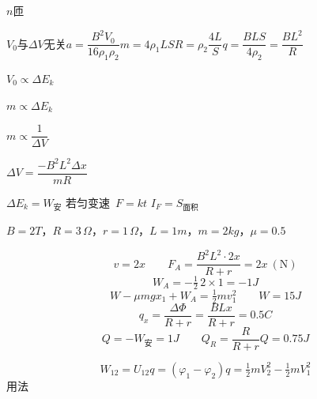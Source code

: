 \quad $n$匝\ 

$V_0$与$\Delta V$无关\qquad $a=\dfrac{B^2V_0}{16\rho_1\rho_2}$\quad $m=4\rho_1LS$\quad $R=\rho_2\dfrac{4L}{S}$\quad $q=\dfrac{BLS}{4\rho_2}=\dfrac{BL^2}{R}$

$V_0\propto\Delta E_k$\qquad {} %

$m\propto\Delta E_k$

$m\propto\dfrac{1}{\Delta V}$

$\Delta V=\dfrac{-B^2L^2\Delta x}{mR}$

$\Delta E_k=W_{\text{安}}$
若匀变速\ $F=kt$
$I_F=S_{\text{面积}}$
\begin{problem}
$B=2\unit{T}$，$R=3\,\Omega$，$r=1\,\Omega$，$L=1\unit{m}$，$m=2\unit{kg}$，$\mu=0.5$
\begin{solution}
\[ v=2x\qquad F_A=\frac{B^2L^2\cdot2x}{R+r}=2x\ (\mathrm{N}) \]
\[ W_A=-\tfrac12\,2\times1=-1\unit{J} \]
\[ W-\mu mgx_1+W_A=\tfrac12mv_1^2\qquad W=15\unit{J} \]
\[ q_x=\frac{\Delta\Phi}{R+r}=\frac{BLx}{R+r}=0.5\unit{C} \]
\[ Q=-W_{\text{安}}=1\unit{J}\qquad Q_R=\frac{R}{R+r}Q=0.75\unit{J} \]
\end{solution}
\end{problem}
\[ W_{12}=U_{12}q=(\varphi_1-\varphi_2)q=\tfrac12mV_2^2-\tfrac12mV_1^2 \]
用法

